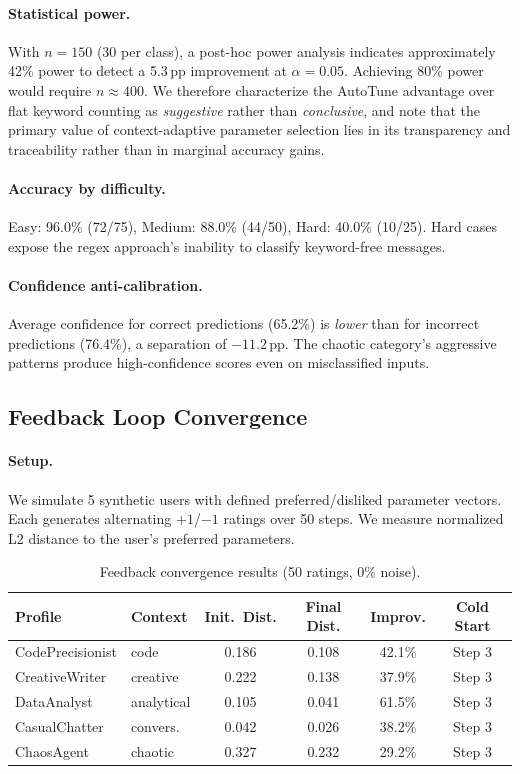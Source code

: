 \documentclass[11pt]{article}
\begin{document}
\paragraph{Statistical power.} With $n=150$ (30 per class), a post-hoc power analysis indicates approximately 42\% power to detect a 5.3\,pp improvement at $\alpha=0.05$. Achieving 80\% power would require $n \approx 400$. We therefore characterize the AutoTune advantage over flat keyword counting as \emph{suggestive} rather than \emph{conclusive}, and note that the primary value of context-adaptive parameter selection lies in its transparency and traceability rather than in marginal accuracy gains.

\paragraph{Accuracy by difficulty.} Easy: 96.0\% (72/75), Medium: 88.0\% (44/50), Hard: 40.0\% (10/25). Hard cases expose the regex approach's inability to classify keyword-free messages.

\paragraph{Confidence anti-calibration.} Average confidence for correct predictions (65.2\%) is \emph{lower} than for incorrect predictions (76.4\%), a separation of $-11.2$\,pp. The chaotic category's aggressive patterns produce high-confidence scores even on misclassified inputs.

\subsection{Feedback Loop Convergence}

\paragraph{Setup.} We simulate 5 synthetic users with defined preferred/disliked parameter vectors. Each generates alternating $+1$/$-1$ ratings over 50 steps. We measure normalized L2 distance to the user's preferred parameters.

\begin{table}[t]
\caption{Feedback convergence results (50 ratings, 0\% noise).}
\label{tab:convergence}
\centering
\small
\begin{tabular}{@{}llcccc@{}}
\toprule
Profile & Context & Init.\ Dist. & Final Dist. & Improv. & Cold Start \\
\midrule
CodePrecisionist & code & 0.186 & 0.108 & 42.1\% & Step 3 \\
CreativeWriter & creative & 0.222 & 0.138 & 37.9\% & Step 3 \\
DataAnalyst & analytical & 0.105 & 0.041 & 61.5\% & Step 3 \\
CasualChatter & convers. & 0.042 & 0.026 & 38.2\% & Step 3 \\
ChaosAgent & chaotic & 0.327 & 0.232 & 29.2\% & Step 3 \\
\bottomrule
\end{tabular}
\end{table}
\end{document}
